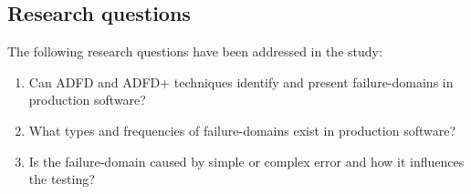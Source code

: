 \documentclass[runningheads,a4paper]{llncs}
\begin{document}
\subsection{Research questions} \label{sec:questions}
The following research questions have been addressed in the study:
\begin{enumerate}
%
\item Can ADFD and ADFD+ techniques identify and present failure-domains in production software? %

%
%
\item What types and frequencies of failure-domains exist in production software? %
%
\item Is the failure-domain caused by simple or complex error and how it influences the testing? %

%


\end{enumerate}
\end{document}

